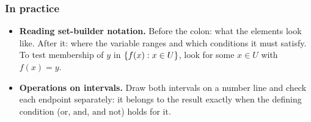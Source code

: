 \subsubsection*{In practice}
\begin{itemize}
    \item \textbf{Reading set-builder notation.} Before the colon: what the elements look like. After it: where the variable ranges and which conditions it must satisfy. To test membership of $y$ in $\left\{f(x) : x\in U\right\}$, look for some $x\in U$ with $f(x)=y$.
    \item \textbf{Operations on intervals.} Draw both intervals on a number line and check each endpoint separately: it belongs to the result exactly when the defining condition ($\text{or}$, $\text{and}$, $\text{and not}$) holds for it.
\end{itemize}
